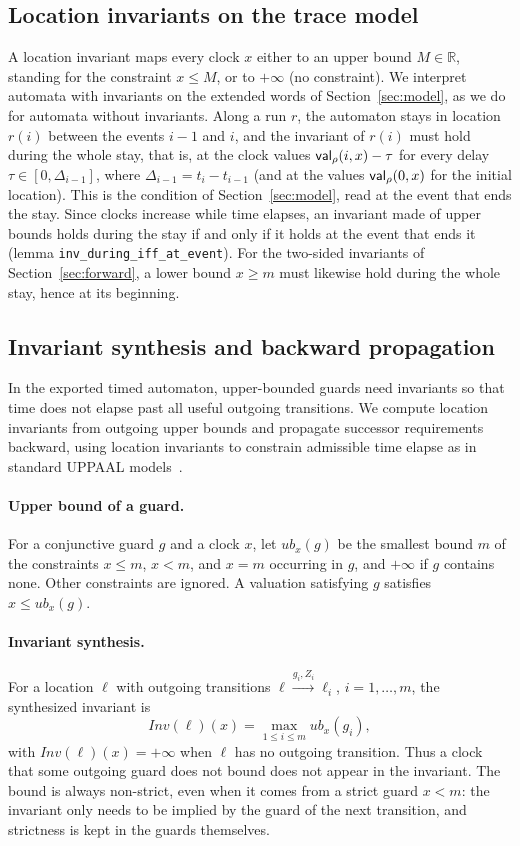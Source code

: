 \subsection{Location invariants on the trace model}
\label{sec:inv-semantics}
A location invariant maps every clock $x$ either to an upper bound
$M\in\mathbb R$, standing for the constraint $x\le M$, or to $+\infty$ (no
constraint).  We interpret automata with invariants on the extended words of
Section~\ref{sec:model}, as we do for automata without invariants.
Along a run $r$, the automaton stays in location $r(i)$ between the events
$i-1$ and $i$, and the invariant of $r(i)$ must hold during the whole stay,
that is, at the clock values $\mathsf{val}_\rho(i,x)-\tau$ for every delay
$\tau\in[0,\Delta_{i-1}]$, where $\Delta_{i-1}=t_i-t_{i-1}$ (and at the values $\mathsf{val}_\rho(0,x)$ for the
initial location).  This is the condition of Section~\ref{sec:model}, read at
the event that ends the stay.  Since clocks increase while time elapses, an
invariant made of upper bounds holds during the stay if and only if it holds at
the event that ends it (lemma \texttt{inv\_\allowbreak{}during\_\allowbreak{}iff\_\allowbreak{}at\_\allowbreak{}event}).
For the two-sided invariants of Section~\ref{sec:forward}, a lower bound
$x\ge m$ must likewise hold during the whole stay, hence at its beginning.

\subsection{Invariant synthesis and backward propagation}
\label{sec:uppaal-invariants}\label{sec:main-invariants}
In the exported timed automaton, upper-bounded guards need invariants so that
time does not elapse past all useful outgoing transitions.  We compute location
invariants from outgoing upper bounds and propagate successor requirements
backward, using location invariants to constrain admissible time elapse as in
standard UPPAAL models~\cite{[BGD04]}.

\paragraph{Upper bound of a guard.}
For a conjunctive guard $g$ and a clock $x$, let $\mathit{ub}_x(g)$ be the
smallest bound $m$ of the constraints $x\le m$, $x<m$, and $x=m$ occurring in
$g$, and $+\infty$ if $g$ contains none.  Other constraints are ignored.  A
valuation satisfying $g$ satisfies $x\le\mathit{ub}_x(g)$.

\paragraph{Invariant synthesis.}
For a location $\ell$ with outgoing transitions
$\ell\xrightarrow{g_i,Z_i}\ell_i$, $i=1,\dots,m$, the synthesized invariant is
\[
  \mathit{Inv}(\ell)(x)=\max_{1\le i\le m}\mathit{ub}_x(g_i),
\]
with $\mathit{Inv}(\ell)(x)=+\infty$ when $\ell$ has no outgoing transition.
Thus a clock that some outgoing guard does not bound does not appear in the
invariant.  The bound is always non-strict, even when it comes from a strict
guard $x<m$: the invariant only needs to be implied by the guard of the next
transition, and strictness is kept in the guards themselves.

